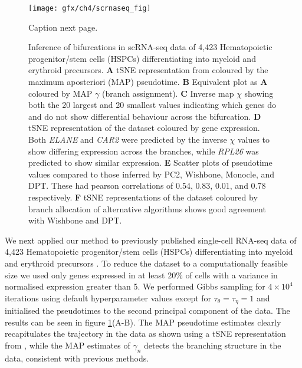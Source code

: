 \begin{figure}
	\centering
	\texttt{[image: gfx/ch4/scrnaseq\_fig]}
	\caption{Caption next page.}
	 \label{fig:scrnaseq}
\end{figure}
\addtocounter{figure}{-1}
\begin{figure}
\caption{Inference of bifurcations in scRNA-seq data of 4,423 Hematopoietic progenitor/stem cells (HSPCs) differentiating into myeloid and erythroid precursors.
\textbf{A} tSNE representation from \cite{setty2016wishbone} coloured by the maximum aposteriori (MAP) pseudotime.
\textbf{B} Equivalent plot as \textbf{A} coloured by MAP $\gamma$ (branch assignment).
\textbf{C} Inverse map $\chi$ showing both the 20 largest and 20 smallest values indicating which genes do and do not show differential behaviour across the bifurcation.
\textbf{D} tSNE representation of the dataset coloured by gene expression. Both \emph{ELANE} and \emph{CAR2} were predicted by the inverse $\chi$ values to show differing expression across the branches, while \emph{RPL26} was predicted to show similar expression.
\textbf{E} Scatter plots of pseudotime values compared to those inferred by PC2, Wishbone, Monocle, and DPT. These had pearson correlations of 0.54, 0.83, 0.01, and 0.78 respectively.
\textbf{F} tSNE representations of the dataset coloured by branch allocation of alternative algorithms shows good agreement with Wishbone and DPT.}
\end{figure}


We next applied our method to previously published single-cell RNA-seq data of 4,423 Hematopoietic progenitor/stem cells (HSPCs) differentiating into myeloid and erythroid precursors \cite{paul2015transcriptional}.
To reduce the dataset to a computationally feasible size we used only genes expressed in at least 20\% of cells with a variance in normalised expression greater than 5.
We performed Gibbs sampling for $4 \times 10^4$ iterations using default hyperparameter values except for $\tau_\theta = \tau_\eta = 1$ and initialised the pseudotimes to the second principal component of the data.
The results can be seen in figure \ref{fig:scrnaseq}(A-B). The MAP pseudotime estimates  clearly recapitulates the trajectory in the data as shown using a tSNE representation from \cite{setty2016wishbone}, while the MAP estimates of $\gamma_n$ detects the branching structure in the data, consistent with previous methods.


